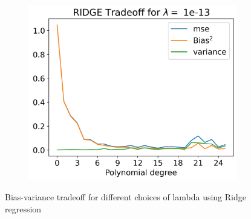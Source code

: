 \documentclass[12pt]{article}
\begin{document}
\begin{figure}[H]
\begin{subfigure}{.5\textwidth}
    \caption{}
    \label{fig:}
  \end{subfigure}
  \begin{subfigure}{.5\textwidth}
    \centering
    \includegraphics[width=.8\textwidth]{../figures/tradeoff_RIDGE_1e-13real.png}
    \caption{}
    \label{fig:}
  \end{subfigure}
  \caption{Bias-variance tradeoff for different choices of lambda using Ridge regression}
  \label{fig:ridge_tradeoff_real}
\end{figure}
\end{document}

